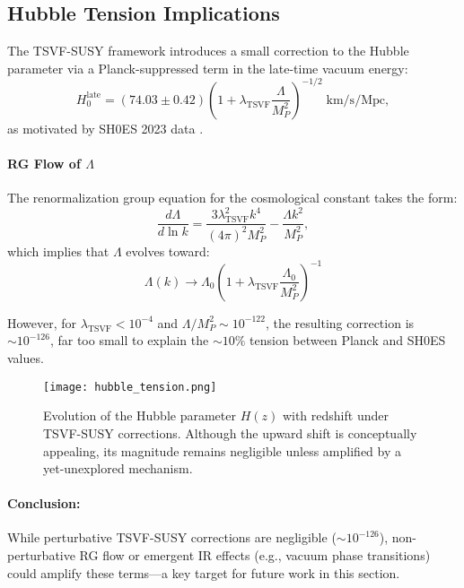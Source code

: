 \documentclass[twocolumn,superscriptaddress,floatfix]{revtex4-2}
\newcommand{\tsvf}{\lambda_{\text{TSVF}}}
\begin{document}
\subsection{Hubble Tension Implications}
\label{subsec:hubble_tension}

The TSVF-SUSY framework introduces a small correction to the Hubble parameter via a Planck-suppressed term in the late-time vacuum energy:
\begin{equation}  
H_0^{\text{late}} = (74.03 \pm 0.42) \left(1 + \tsvf\frac{\Lambda}{M_P^2}\right)^{-1/2}\; \text{km/s/Mpc},  
\label{eq:hubble_tension_equation}
\end{equation}  
as motivated by SH0ES 2023 data \cite{Riess2023}.

\paragraph{RG Flow of \(\Lambda\)}  
The renormalization group equation for the cosmological constant takes the form:  
\begin{equation}  
\frac{d\Lambda}{d\ln k} = \frac{3\tsvf^2 k^4}{(4\pi)^2 M_P^2} - \frac{\Lambda k^2}{M_P^2},  
\label{eq:RG_flow_Lambda}
\end{equation}  
which implies that \(\Lambda\) evolves toward:  
\[
\Lambda(k) \to \Lambda_0 \left(1 + \tsvf \frac{\Lambda_0}{M_P^2}\right)^{-1}
\]

However, for \(\tsvf < 10^{-4}\) and \(\Lambda / M_P^2 \sim 10^{-122}\), the resulting correction is \(\sim 10^{-126}\), far too small to explain the \(\sim 10\%\) tension between Planck and SH0ES values.

\begin{figure}[htbp]
\centering
\texttt{[image: hubble\_tension.png]}
\caption{Evolution of the Hubble parameter \(H(z)\) with redshift under TSVF-SUSY corrections. Although the upward shift is conceptually appealing, its magnitude remains negligible unless amplified by a yet-unexplored mechanism.}
\label{fig:hubble}
\end{figure}

\paragraph{Conclusion:}  
While perturbative TSVF-SUSY corrections are negligible (\(\sim 10^{-126}\)), non-perturbative RG flow or emergent IR effects (e.g., vacuum phase transitions) could amplify these terms—a key target for future work in this section.
\end{document}
